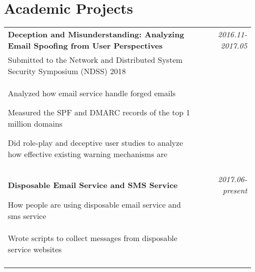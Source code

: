 \documentclass[a4paper,10pt]{article}
\begin{document}
\section{Academic Projects}
\begin{tabular}{p{13.5cm}p{0.5cm}r}

\textbf{Deception and Misunderstanding: Analyzing Email Spoofing from User Perspectives} && \emph{2016.11-2017.05} \\
\hspace{1em} Submitted to the Network and Distributed System Security Symposium  (NDSS) 2018 && \vspace{-0.5em} \\
\begin{compactitem}
\item Analyzed how email service handle forged emails
\item Measured the SPF and DMARC records of the top 1 million domains
\item Did role-play and deceptive user studies to analyze how effective existing warning mechanisms are
\end{compactitem}&&\vspace{-2.2em} \\
\multicolumn{3}{c}{} \\

\textbf{Disposable Email Service and SMS Service} && \emph{2017.06-present} \\
\hspace{1em} How people are using disposable email service and sms service && \vspace{-0.5em} \\
\begin{compactitem}
\item Wrote scripts to collect messages from disposable service websites
\end{compactitem}&&\vspace{-2.2em} \\
\multicolumn{3}{c}{} \\

\end{tabular}
\end{document}
